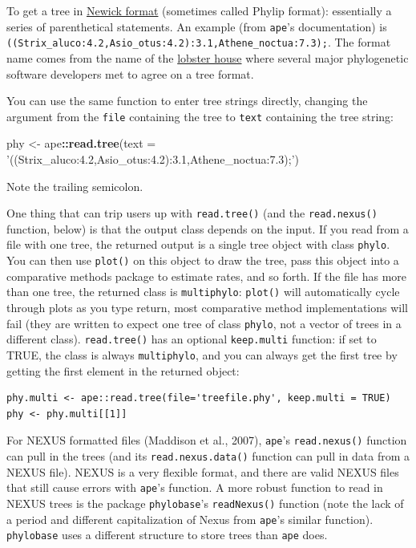 \documentclass[]{article}
\newenvironment{Shaded}{\begin{snugshade}}{\end{snugshade}}
\newcommand{\DataTypeTok}[1]{\textcolor[rgb]{0.13,0.29,0.53}{#1}}
\newcommand{\KeywordTok}[1]{\textcolor[rgb]{0.13,0.29,0.53}{\textbf{#1}}}
\newcommand{\NormalTok}[1]{#1}
\newcommand{\OperatorTok}[1]{\textcolor[rgb]{0.81,0.36,0.00}{\textbf{#1}}}
\newcommand{\StringTok}[1]{\textcolor[rgb]{0.31,0.60,0.02}{#1}}
\theoremstyle{definition}
\theoremstyle{definition}
\theoremstyle{definition}
\theoremstyle{remark}
\begin{document}
To get a tree in
\href{http://evolution.genetics.washington.edu/phylip/newicktree.html}{Newick
format} (sometimes called Phylip format): essentially a series of
parenthetical statements. An example (from \texttt{ape}'s documentation)
is \texttt{((Strix\_aluco:4.2,Asio\_otus:4.2):3.1,Athene\_noctua:7.3);}.
The format name comes from the name of the
\href{http://newicks.com}{lobster house} where several major
phylogenetic software developers met to agree on a tree format.

You can use the same function to enter tree strings directly, changing
the argument from the \texttt{file} containing the tree to \texttt{text}
containing the tree string:

\begin{Shaded}
\begin{Highlighting}[]
\NormalTok{phy <-}\StringTok{ }\NormalTok{ape}\OperatorTok{::}\KeywordTok{read.tree}\NormalTok{(}\DataTypeTok{text =} \StringTok{'((Strix_aluco:4.2,Asio_otus:4.2):3.1,Athene_noctua:7.3);'}\NormalTok{)}
\end{Highlighting}
\end{Shaded}

Note the trailing semicolon.

One thing that can trip users up with \texttt{read.tree()} (and the
\texttt{read.nexus()} function, below) is that the output class depends
on the input. If you read from a file with one tree, the returned output
is a single tree object with class \texttt{phylo}. You can then use
\texttt{plot()} on this object to draw the tree, pass this object into a
comparative methods package to estimate rates, and so forth. If the file
has more than one tree, the returned class is \texttt{multiphylo}:
\texttt{plot()} will automatically cycle through plots as you type
return, most comparative method implementations will fail (they are
written to expect one tree of class \texttt{phylo}, not a vector of
trees in a different class). \texttt{read.tree()} has an optional
\texttt{keep.multi} function: if set to TRUE, the class is always
\texttt{multiphylo}, and you can always get the first tree by getting
the first element in the returned object:

\begin{verbatim}
phy.multi <- ape::read.tree(file='treefile.phy', keep.multi = TRUE)
phy <- phy.multi[[1]]
\end{verbatim}

For NEXUS formatted files (Maddison et al., 2007), \texttt{ape}'s
\texttt{read.nexus()} function can pull in the trees (and its
\texttt{read.nexus.data()} function can pull in data from a NEXUS file).
NEXUS is a very flexible format, and there are valid NEXUS files that
still cause errors with \texttt{ape}'s function. A more robust function
to read in NEXUS trees is the package \texttt{phylobase}'s
\texttt{readNexus()} function (note the lack of a period and different
capitalization of Nexus from \texttt{ape}'s similar function).
\texttt{phylobase} uses a different structure to store trees than
\texttt{ape} does.
\end{document}
